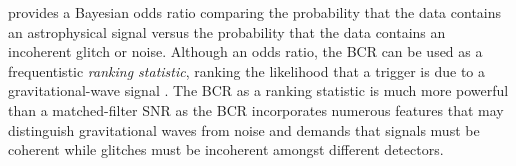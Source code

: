 \documentclass[%
 reprint,
 amsmath,amssymb,
 aps,
]{revtex4}
\newcommand{\bcr}{{\sc BCR}\xspace}
\begin{document}
 provides a Bayesian odds ratio comparing the probability that the data contains an astrophysical signal versus the probability that the data contains an incoherent glitch or noise. Although an odds ratio, the \bcr can be used  as a frequentistic \textit{ranking statistic}, ranking the likelihood that a trigger is due to a gravitational-wave signal \cite{BCR}. The \bcr as a ranking statistic is much more powerful than a matched-filter SNR as the \bcr incorporates numerous features that may distinguish gravitational waves from noise and demands that signals must be coherent while glitches must be incoherent amongst different detectors. \\



 
 
 
 
\end{document}
